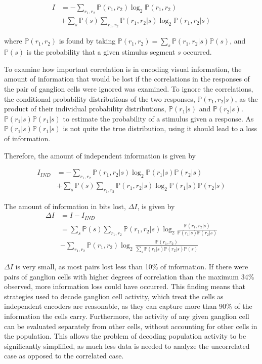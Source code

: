 \documentclass[twoside]{article}
\begin{document}
\begin{multicols}{2}
\begin{align}\label{eq:info-theory}
	I 
		&= -\sum_{r_1,r_2}\mathbb{P}(r_1,r_2)\log_2\mathbb{P}(r_1,r_2) \\
  		&+ \sum_s\mathbb{P}(s) \sum_{r_1,r_2}\mathbb{P}(r_1,r_2|s)\log_2\mathbb{P}(r_1,r_2|s)
\end{align}

where $\mathbb{P}(r_1,r_2)$ is found by taking $\mathbb{P}(r_1,r_2) = \sum_s \mathbb{P}(r_1,r_2|s)\mathbb{P}(s)$, and $\mathbb{P}(s)$ is the probability that a given stimulus segment $s$ occurred. 

To examine how important correlation is in encoding visual information, the amount of information that would be lost if the correlations in the responses of the pair of ganglion cells were ignored was examined. To ignore the correlations, the conditional probability distributions of the two responses, $\mathbb{P}(r_1,r_2|s)$, as the product of their individual probability distributions, $\mathbb{P}(r_1|s)$ and $\mathbb{P}(r_2|s)$. $\mathbb{P}(r_1|s)\mathbb{P}(r_1|s)$ to estimate the probability of a stimulus given a response. As $\mathbb{P}(r_1|s)\mathbb{P}(r_1|s)$ is not quite the true distribution, using it should lead to a loss of information. 

Therefore, the amount of independent information is given by

\begin{align}
	I_{IND} 
		&= -\sum_{r_1,r_2}\mathbb{P}(r_1,r_2|s)\log_2\mathbb{P}(r_1|s)\mathbb{P}(r_2|s) \\
		&+ \sum_s\mathbb{P}(s) \sum_{r_1,r_2}\mathbb{P}(r_1,r_2|s)\log_2\mathbb{P}(r_1|s)\mathbb{P}(r_2|s) 
\end{align}

The amount of information in bits lost, $\Delta I$, is given by 
\begin{align}
	\Delta I 
		&= I - I_{IND} \\
		&= \sum_s\mathbb{P}(s) \sum_{r_1,r_2}\mathbb{P}(r_1,r_2|s) \log_2 \frac{\mathbb{P}(r_1,r_2|s)}{\mathbb{P}(r_1|s)\mathbb{P}(r_2|s)} \\
		&- \sum_{r_1,r_2}\mathbb{P}(r_1,r_2) \log_2 \frac{\mathbb{P}(r_1,r_2)}{\sum_s \mathbb{P}(r_1|s)\mathbb{P}(r_2|s) \mathbb{P}(s)} 
\end{align}

$\Delta I$ is very small, as most pairs lost less than 10\% of information. If there were pairs of ganglion cells with higher degrees of correlation than the maximum 34\% observed, more information loss could have occurred. This finding means that strategies used to decode ganglion cell activity, which treat the cells as independent encoders are reasonable, as they can capture more than 90\% of the information the cells carry. Furthermore, the activity of any given ganglion cell can be evaluated separately from other cells, without accounting for other cells in the population. This allows the problem of decoding population activity to be significantly simplified, as much less data is needed to analyze the uncorrelated case as opposed to the correlated case. 


\end{multicols}
\end{document}
